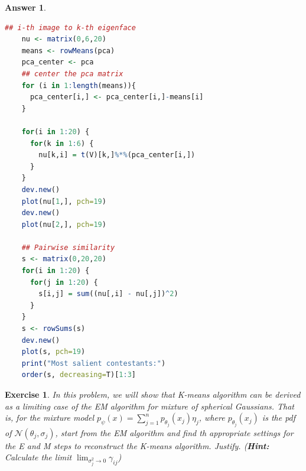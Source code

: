\documentclass[12pt]{article}
\theoremstyle{colon}
\newtheorem{exercise}{Exercise}
\newtheorem*{answer}{Answer}
\begin{document}
\begin{answer}
\begin{lstlisting}[language=R, basicstyle=\scriptsize, breaklines=true]
    ## i-th image to k-th eigenface
    nu <- matrix(0,6,20)
    means <- rowMeans(pca)
    pca_center <- pca
    ## center the pca matrix
    for (i in 1:length(means)){
      pca_center[i,] <- pca_center[i,]-means[i]
    }

    for(i in 1:20) {
      for(k in 1:6) {
        nu[k,i] = t(V)[k,]%*%(pca_center[i,])
      }
    }
    dev.new()
    plot(nu[1,], pch=19)
    dev.new()
    plot(nu[2,], pch=19)

    ## Pairwise similarity
    s <- matrix(0,20,20)
    for(i in 1:20) {
      for(j in 1:20) {
        s[i,j] = sum((nu[,i] - nu[,j])^2)
      }
    }
    s <- rowSums(s)
    dev.new()
    plot(s, pch=19)
    print("Most salient contestants:")
    order(s, decreasing=T)[1:3]
  \end{lstlisting}
\end{answer}

\clearpage

\begin{exercise}
  In this problem, we will show that K-means algorithm can be derived as a limiting case of the EM algorithm for mixture of spherical Gaussians. That is, for the mixture model $p_{\psi} (x) = \sum_{j=1}^n p_{\theta_j} (x_j) \eta_j$, where $p_{\theta_j} (x_j)$ is the pdf of $\mathcal{N}(\theta_j, \sigma_j)$, start from the EM algorithm and find th appropriate settings for the E and M steps to reconstruct the K-means algorithm. Justify. (\textbf{Hint:} Calculate the limit $\lim_{\sigma_j^2 \rightarrow 0} \gamma_{ij}$)
\end{exercise}
\end{document}
